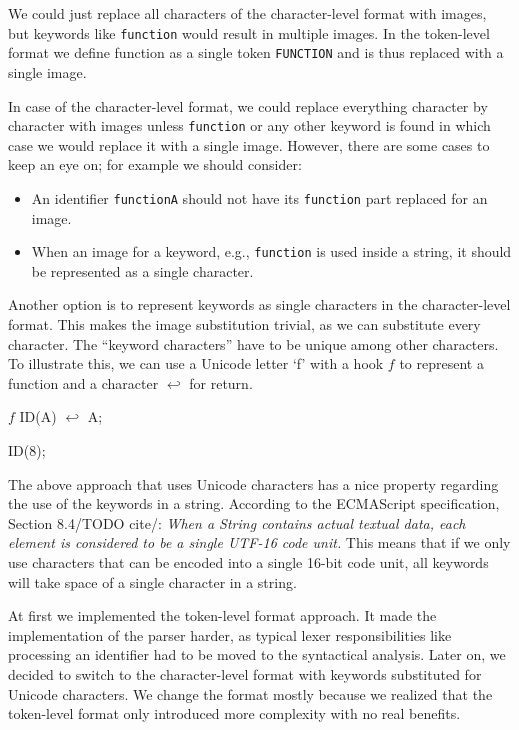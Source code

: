 We could just replace all characters of the character-level format with images, but keywords like \texttt{function} would result in multiple images. In the token-level
format we define function as a single token \texttt{FUNCTION} and is thus replaced with a single image.

In case of the character-level format, we could replace everything character by character with images unless \texttt{function} or any other keyword is found in which
case we would replace it with a single image. However, there are some cases to keep an eye on; for example we should consider:
\begin{itemize}
    \item An identifier \texttt{functionA} should not have its \texttt{function} part replaced for an image.
    \item When an image for a keyword, e.g., \texttt{function} is used inside a string, it should be represented as a single character.
\end{itemize}

Another option is to represent keywords as single characters in the character-level format. This makes the image substitution trivial, as we can substitute
every character. The ``keyword characters'' have to be unique among other characters. To illustrate this, we can use a Unicode letter `f' with a hook $f$
to represent a function and a character $\hookleftarrow$ for return.
\begin{code}
$f$ ID(A) {
    $\hookleftarrow$ A;
}

ID(8);
\end{code}

The above approach that uses Unicode characters has a nice property regarding the use of the keywords in a string. According to the ECMAScript specification,
Section 8.4/TODO cite/: \emph{When a String contains actual textual data, each element is considered to be a single UTF-16 code unit.} This means that if we
only use characters that can be encoded into a single 16-bit code unit, all keywords will take space of a single character in a string.

At first we implemented the token-level format approach. It made the implementation of the parser harder, as typical lexer responsibilities like processing
an identifier had to be moved to the syntactical analysis. Later on, we decided to switch to the character-level format with keywords substituted for
Unicode characters. We change the format mostly because we realized that the token-level format only introduced more complexity with no real benefits.

